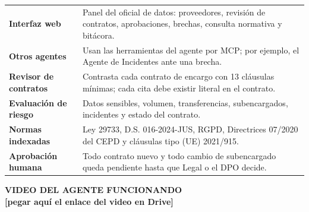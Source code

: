 \documentclass[11pt,a4paper]{article}
\newcommand{\EnlaceVideo}{[pegar aquí el enlace del video en Drive]}
\begin{document}
\vspace{6mm}
\small
\begin{tabular}{@{}p{36mm}p{126mm}@{}}
\textbf{Interfaz web} & Panel del oficial de datos: proveedores, revisión de contratos, aprobaciones, brechas, consulta normativa y bitácora.\\[1.5mm]
\textbf{Otros agentes} & Usan las herramientas del agente por MCP; por ejemplo, el Agente de Incidentes ante una brecha.\\[1.5mm]
\textbf{Revisor de contratos} & Contrasta cada contrato de encargo con 13 cláusulas mínimas; cada cita debe existir literal en el contrato.\\[1.5mm]
\textbf{Evaluación de riesgo} & Datos sensibles, volumen, transferencias, subencargados, incidentes y estado del contrato.\\[1.5mm]
\textbf{Normas indexadas} & Ley 29733, D.S. 016-2024-JUS, RGPD, Directrices 07/2020 del CEPD y cláusulas tipo (UE) 2021/915.\\[1.5mm]
\textbf{Aprobación humana} & Todo contrato nuevo y todo cambio de subencargado queda pendiente hasta que Legal o el DPO decide.
\end{tabular}

\vfill
\begin{tcolorbox}[colback=acento!5, colframe=acento, boxrule=1pt, arc=3pt, left=5mm, right=5mm, top=3mm, bottom=3mm]
{\large\bfseries\color{guinda} VIDEO DEL AGENTE FUNCIONANDO}\\[2mm]
{\large\bfseries\color{acento} \EnlaceVideo}
\end{tcolorbox}
\end{document}
